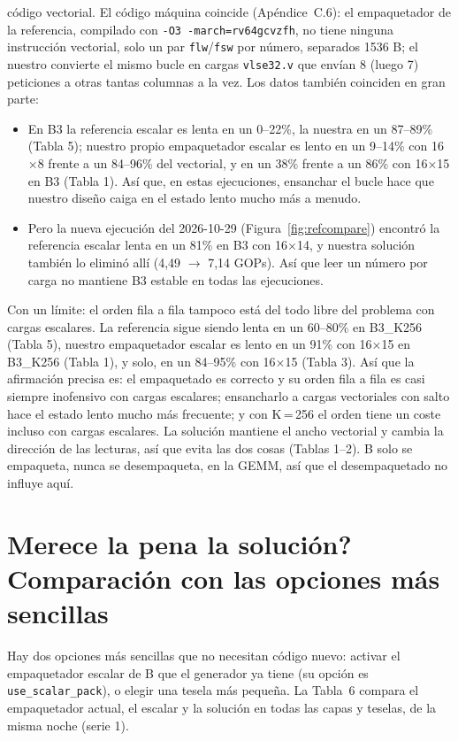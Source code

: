 \documentclass[10pt,a4paper]{article}
\begin{document}
\begin{enumerate}
  código vectorial. El código máquina coincide (Apéndice~C.6): el empaquetador de la referencia, compilado con
  \texttt{-O3 -march=rv64gcvzfh}, no tiene ninguna instrucción vectorial, solo un par \texttt{flw}/\texttt{fsw} por número, separados
  1536 B; el nuestro convierte el mismo bucle en cargas \texttt{vlse32.v} que envían 8 (luego 7) peticiones a otras tantas columnas a la
  vez. Los datos también coinciden en gran parte:
  \begin{itemize}
    \item En B3 la referencia escalar es lenta en un 0--22\%, la nuestra en un 87--89\% (Tabla 5); nuestro propio empaquetador escalar
    es lento en un 9--14\% con 16$\times$8 frente a un 84--96\% del vectorial, y en un 38\% frente a un 86\% con 16$\times$15 en B3
    (Tabla 1). Así que, en estas ejecuciones, ensanchar el bucle hace que nuestro diseño caiga en el estado lento mucho más a menudo.
    \item Pero la nueva ejecución del 2026-10-29 (Figura~\ref{fig:refcompare}) encontró la referencia escalar lenta en un 81\% en B3
    con 16$\times$14, y nuestra solución también lo eliminó allí (4,49 $\to$ 7,14 GOPs). Así que leer un número por carga no mantiene
    B3 estable en todas las ejecuciones.
  \end{itemize}
  Con un límite: el orden fila a fila tampoco está del todo libre del problema con cargas escalares. La referencia sigue siendo lenta
  en un 60--80\% en B3\_K256 (Tabla 5), nuestro empaquetador escalar es lento en un 91\% con 16$\times$15 en B3\_K256 (Tabla 1), y
  solo, en un 84--95\% con 16$\times$15 (Tabla 3). Así que la afirmación precisa es: el empaquetado es correcto y su orden fila a fila
  es casi siempre inofensivo con cargas escalares; ensancharlo a cargas vectoriales con salto hace el estado lento mucho más
  frecuente; y con K\,=\,256 el orden tiene un coste incluso con cargas escalares. La solución mantiene el ancho vectorial y cambia la
  dirección de las lecturas, así que evita las dos cosas (Tablas 1--2). B solo se empaqueta, nunca se desempaqueta, en la GEMM, así
  que el desempaquetado no influye aquí.
\end{enumerate}

\section{\textquestiondown{}Merece la pena la solución? Comparación con las opciones más sencillas}
\label{sec:worth}
Hay dos opciones más sencillas que no necesitan código nuevo: activar el empaquetador escalar de B que el generador ya tiene (su
opción es \texttt{use\_scalar\_pack}), o elegir una tesela más pequeña. La Tabla~6 compara el empaquetador actual, el escalar y la
solución en todas las capas y teselas, de la misma noche (serie 1).
\end{document}
